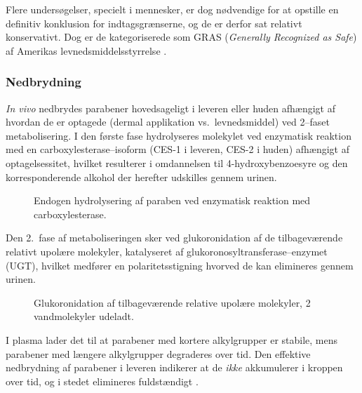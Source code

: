     Flere undersøgelser, specielt i mennesker, er dog nødvendige for at opstille en definitiv konklusion for indtagsgrænserne, og de er derfor sat relativt konservativt. Dog er de kategoriserede som GRAS (\textit{Generally Recognized as Safe}) af Amerikas levnedsmiddelsstyrrelse \parencite{FDA2022}.

    \subsubsection{Nedbrydning}
    \textit{In vivo} nedbrydes parabener hovedsageligt i leveren eller huden afhængigt af hvordan de er optagede (dermal applikation vs.\ levnedsmiddel) ved 2--faset metabolisering. I den første fase hydrolyseres molekylet ved enzymatisk reaktion med en carboxylesterase--isoform (CES-1 i leveren, CES-2 i huden) afhængigt af optagelsessitet, hvilket resulterer i omdannelsen til 4-hydroxybenzoesyre og den korresponderende alkohol der herefter udskilles gennem urinen.
    \begin{figure}[H]
        \caption{Endogen hydrolysering af paraben ved enzymatisk reaktion med carboxylesterase.}
    \end{figure}
    Den 2.\ fase af metaboliseringen sker ved glukoronidation af de tilbageværende relativt upolære molekyler, katalyseret af glukoronosyltransferase--enzymet (UGT), hvilket medfører en polaritetsstigning hvorved de kan elimineres gennem urinen.
    \begin{figure}[H]
        \caption{Glukoronidation af tilbageværende relative upolære molekyler, 2 vandmolekyler udeladt.}
    \end{figure}
    I plasma lader det til at parabener med kortere alkylgrupper er stabile, mens parabener med længere alkylgrupper degraderes over tid. Den effektive nedbrydning af parabener i leveren indikerer at de \textit{ikke} akkumulerer i kroppen over tid, og i stedet elimineres fuldstændigt \parencite{Suza2010}.

